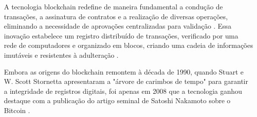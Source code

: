 


A tecnologia blockchain redefine de maneira fundamental a condução de transações, a assinatura de contratos e a realização de diversas operações, eliminando a necessidade de aprovações centralizadas para validação \cite{Blockchain}. Essa inovação estabelece um registro distribuído de transações, verificado por uma rede de computadores e organizado em blocos, criando uma cadeia de informações imutáveis e resistentes à adulteração \cite{IBM, Immutability}.

Embora as origens do blockchain remontem à década de 1990, quando Stuart e W. Scott Stornetta apresentaram a "árvore de carimbos de tempo" para garantir a integridade de registros digitais, foi apenas em 2008 que a tecnologia ganhou destaque com a publicação do artigo seminal de Satoshi Nakamoto sobre o Bitcoin \cite{Origem-Blockchain}.

